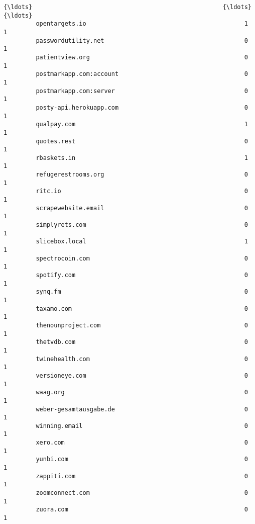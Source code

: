\documentclass[11pt]{article}
\begin{document}
\begin{Verbatim}[commandchars=\\\{\}]
         {\ldots}                                                     {\ldots}      {\ldots}   
         opentargets.io                                            1        1   
         passwordutility.net                                       0        1   
         patientview.org                                           0        1   
         postmarkapp.com:account                                   0        1   
         postmarkapp.com:server                                    0        1   
         posty-api.herokuapp.com                                   0        1   
         qualpay.com                                               1        1   
         quotes.rest                                               0        1   
         rbaskets.in                                               1        1   
         refugerestrooms.org                                       0        1   
         ritc.io                                                   0        1   
         scrapewebsite.email                                       0        1   
         simplyrets.com                                            0        1   
         slicebox.local                                            1        1   
         spectrocoin.com                                           0        1   
         spotify.com                                               0        1   
         synq.fm                                                   0        1   
         taxamo.com                                                0        1   
         thenounproject.com                                        0        1   
         thetvdb.com                                               0        1   
         twinehealth.com                                           0        1   
         versioneye.com                                            0        1   
         waag.org                                                  0        1   
         weber-gesamtausgabe.de                                    0        1   
         winning.email                                             0        1   
         xero.com                                                  0        1   
         yunbi.com                                                 0        1   
         zappiti.com                                               0        1   
         zoomconnect.com                                           0        1   
         zuora.com                                                 0        1   
         

\end{Verbatim}
\end{document}
